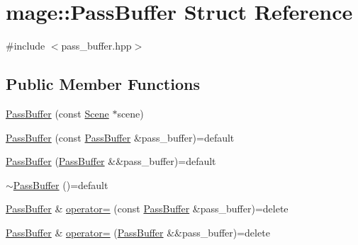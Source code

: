 \hypertarget{structmage_1_1_pass_buffer}{}\section{mage\+:\+:Pass\+Buffer Struct Reference}
\label{structmage_1_1_pass_buffer}


{\ttfamily \#include $<$pass\+\_\+buffer.\+hpp$>$}

\subsection*{Public Member Functions}
\begin{DoxyCompactItemize}
\item 
\hyperlink{structmage_1_1_pass_buffer_af3625cd3aad45b4001744c7134c3db26}{Pass\+Buffer} (const \hyperlink{classmage_1_1_scene}{Scene} $\ast$scene)
\item 
\hyperlink{structmage_1_1_pass_buffer_a1c6e779725227ebbb8e3d15a4515edbc}{Pass\+Buffer} (const \hyperlink{structmage_1_1_pass_buffer}{Pass\+Buffer} \&pass\+\_\+buffer)=default
\item 
\hyperlink{structmage_1_1_pass_buffer_a8f6baa279c6dc8c5b6869240d0169677}{Pass\+Buffer} (\hyperlink{structmage_1_1_pass_buffer}{Pass\+Buffer} \&\&pass\+\_\+buffer)=default
\item 
\hyperlink{structmage_1_1_pass_buffer_a650dec579522b7d5c5810a535b10773a}{$\sim$\+Pass\+Buffer} ()=default
\item 
\hyperlink{structmage_1_1_pass_buffer}{Pass\+Buffer} \& \hyperlink{structmage_1_1_pass_buffer_a8d0cc48dea7dfb6b710b6162b3a82b7e}{operator=} (const \hyperlink{structmage_1_1_pass_buffer}{Pass\+Buffer} \&pass\+\_\+buffer)=delete
\item 
\hyperlink{structmage_1_1_pass_buffer}{Pass\+Buffer} \& \hyperlink{structmage_1_1_pass_buffer_a8a5832066c415bea077107c7a9d18df5}{operator=} (\hyperlink{structmage_1_1_pass_buffer}{Pass\+Buffer} \&\&pass\+\_\+buffer)=delete
\end{DoxyCompactItemize}

